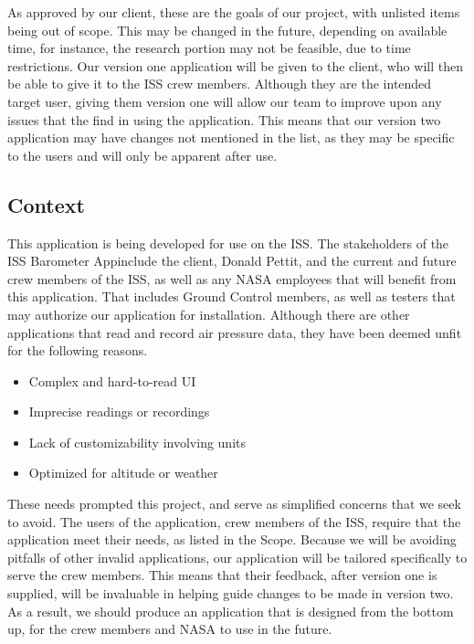 \documentclass[onecolumn, draftclsnofoot,10pt, compsoc]{IEEEtran}
\def \CapstoneProjectName{ISS Barometer App}
\begin{document}
As approved by our client, these are the goals of our project, with unlisted items being out of scope.
This may be changed in the future, depending on available time, for instance, the research portion may not be feasible, due to time restrictions.
Our version one application will be given to the client, who will then be able to give it to the ISS crew members.
Although they are the intended target user, giving them version one will allow our team to improve upon any issues that the find in using the application.
This means that our version two application may have changes not mentioned in the list, as they may be specific to the users and will only be apparent after use.

\subsection{Context}
This application is being developed for use on the ISS.
The stakeholders of the \CapstoneProjectName include the client, Donald Pettit, and the current and future crew members of the ISS, as well as any NASA employees that will benefit from this application.
That includes Ground Control members, as well as testers that may authorize our application for installation.
Although there are other applications that read and record air pressure data, they have been deemed unfit for the following reasons.
\begin{itemize}
	\item Complex and hard-to-read UI
	\item Imprecise readings or recordings
	\item Lack of customizability involving units
	\item Optimized for altitude or weather
\end{itemize}
These needs prompted this project, and serve as simplified concerns that we seek to avoid.
The users of the application, crew members of the ISS, require that the application meet their needs, as listed in the Scope.
Because we will be avoiding pitfalls of other invalid applications, our application will be tailored specifically to serve the crew members.
This means that their feedback, after version one is supplied, will be invaluable in helping guide changes to be made in version two.
As a result, we should produce an application that is designed from the bottom up, for the crew members and NASA to use in the future.
\end{document}
